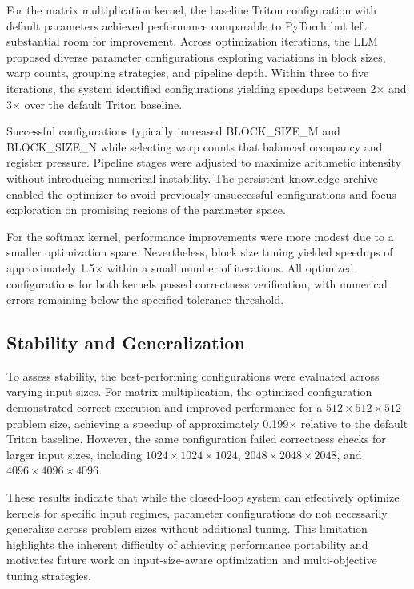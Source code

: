 \documentclass{article}
\begin{document}
For the matrix multiplication kernel, the baseline Triton configuration with default parameters achieved performance comparable to PyTorch but left substantial room for improvement. Across optimization iterations, the LLM proposed diverse parameter configurations exploring variations in block sizes, warp counts, grouping strategies, and pipeline depth. Within three to five iterations, the system identified configurations yielding speedups between 2$\times$ and 3$\times$ over the default Triton baseline.

Successful configurations typically increased BLOCK\_SIZE\_M and BLOCK\_SIZE\_N while selecting warp counts that balanced occupancy and register pressure. Pipeline stages were adjusted to maximize arithmetic intensity without introducing numerical instability. The persistent knowledge archive enabled the optimizer to avoid previously unsuccessful configurations and focus exploration on promising regions of the parameter space.

For the softmax kernel, performance improvements were more modest due to a smaller optimization space. Nevertheless, block size tuning yielded speedups of approximately 1.5$\times$ within a small number of iterations. All optimized configurations for both kernels passed correctness verification, with numerical errors remaining below the specified tolerance threshold.

\subsection{Stability and Generalization}

To assess stability, the best-performing configurations were evaluated across varying input sizes. For matrix multiplication, the optimized configuration demonstrated correct execution and improved performance for a $512 \times 512 \times 512$ problem size, achieving a speedup of approximately 0.199× relative to the default Triton baseline. However, the same configuration failed correctness checks for larger input sizes, including $1024 \times 1024 \times 1024$, $2048 \times 2048 \times 2048$, and $4096 \times 4096 \times 4096$.

These results indicate that while the closed-loop system can effectively optimize kernels for specific input regimes, parameter configurations do not necessarily generalize across problem sizes without additional tuning. This limitation highlights the inherent difficulty of achieving performance portability and motivates future work on input-size-aware optimization and multi-objective tuning strategies.
\end{document}
